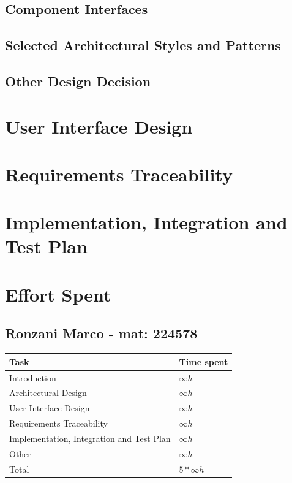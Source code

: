 \documentclass[11pt]{article}
\begin{document}
\newpage

\subsection{Component Interfaces}

\subsection{Selected Architectural Styles and Patterns}

\subsection{Other Design Decision}

\section{User Interface Design}

\section{Requirements Traceability}

\section{Implementation, Integration and Test Plan}


\section{Effort Spent}

\subsection{Ronzani Marco - mat: 224578}

\begin{tabular}{|l|l|}
    \hline
    \textbf{Task} & \textbf{Time spent} \\
    \hline
    Introduction & $\infty h$ \\
    \hline
    Architectural Design & $\infty h$ \\
    \hline
    User Interface Design & $\infty h$ \\
    \hline
    Requirements Traceability & $\infty h$ \\
    \hline
    Implementation, Integration and Test Plan & $\infty h$ \\
    \hline
    Other & $\infty h$ \\
    \hline
    \hline
    Total & $5*\infty h$ \\
    \hline
\end{tabular}
\end{document}
